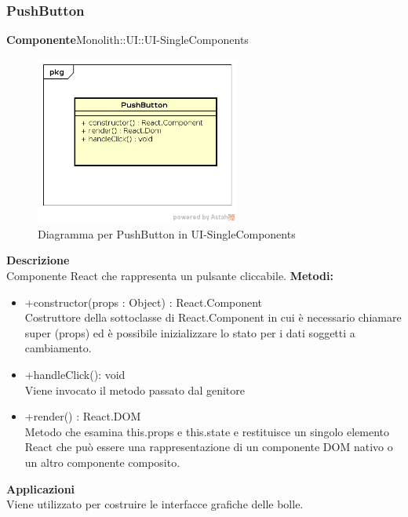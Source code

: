 \clearpage

\subsubsection{PushButton}
\textbf{Componente}Monolith::UI::UI-SingleComponents\\
   \FloatBarrier
   \begin{figure}[ht]
   \centering
   \includegraphics[width=0.6\textwidth]{img/single-PushButton}
   \caption{{Diagramma per PushButton in UI-SingleComponents}}
\end{figure}
\FloatBarrier
\textbf{Descrizione}\\
Componente React che rappresenta un pulsante cliccabile.
\textbf{Metodi:} \begin{itemize}\item +constructor(props : Object) : React.Component \\Costruttore della sottoclasse di React.Component in cui è necessario chiamare super (props) ed è possibile inizializzare lo stato per i dati soggetti a cambiamento.\item +handleClick(): void \\Viene invocato il metodo passato dal genitore\item +render() : React.DOM \\Metodo che esamina this.props e this.state e restituisce un singolo elemento React che può essere una rappresentazione di un componente DOM nativo o un altro componente composito.\end{itemize} 


\textbf{Applicazioni}\\
Viene utilizzato per costruire le interfacce grafiche delle bolle. 


\clearpage

